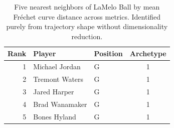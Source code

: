 \begin{table}[htbp]
  \centering\small
  \begin{tabular}{rllc}
    \toprule
    Rank & Player & Position & Archetype \\
    \midrule
    1 & Michael Jordan & G & 1 \\
    2 & Tremont Waters & G & 1 \\
    3 & Jared Harper & G & 1 \\
    4 & Brad Wanamaker & G & 1 \\
    5 & Bones Hyland & G & 1 \\
    \bottomrule
  \end{tabular}
  \caption{Five nearest neighbors of LaMelo Ball by mean Fr\'{e}chet curve distance across metrics. Identified purely from trajectory shape without dimensionality reduction.}
  \label{tab:LaMelo_Ball_frechet_curve_neighbors}
\end{table}

